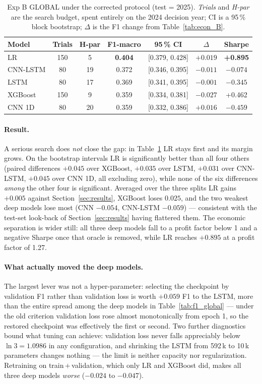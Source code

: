 \documentclass[runningheads]{llncs}
\begin{document}
\begin{table}[t]
\centering
\small
\caption{Exp B GLOBAL under the corrected protocol (test = 2025). \emph{Trials} and
\emph{H-par} are the search budget, spent entirely on the 2024 decision year; CI is
a 95\,\% block bootstrap; $\Delta$ is the F1 change from Table~\ref{tab:econ_B}.}
\label{tab:robust}
\begin{tabular}{lcccccc}
\toprule
Model & Trials & H-par & F1-macro & 95\,\% CI & $\Delta$ & Sharpe \\
\midrule
LR & 150 & 5 & \textbf{0.404} & [0.379, 0.428] & $+0.019$ & \textbf{+0.895} \\
CNN-LSTM & 80 & 19 & 0.372 & [0.346, 0.395] & $-0.011$ & $-0.074$ \\
LSTM & 80 & 17 & 0.369 & [0.341, 0.395] & $-0.001$ & $-0.345$ \\
XGBoost & 150 & 9 & 0.359 & [0.334, 0.381] & $-0.027$ & +0.462 \\
CNN 1D & 80 & 20 & 0.359 & [0.332, 0.386] & $+0.016$ & $-0.459$ \\
\bottomrule
\end{tabular}
\end{table}

\paragraph{Result.}
A serious search does \emph{not} close the gap: in Table~\ref{tab:robust} LR stays
first and its margin grows. On the bootstrap intervals LR is significantly better
than all four others (paired differences $+0.045$ over XGBoost, $+0.035$ over LSTM,
$+0.031$ over CNN-LSTM, $+0.045$ over CNN 1D, all excluding zero), while none of the
six differences \emph{among} the other four is significant. Averaged over the three
splits LR gains $+0.005$ against Section~\ref{sec:results}, XGBoost loses $0.025$,
and the two weakest deep models lose most (CNN $-0.054$, CNN-LSTM $-0.059$) ---
consistent with the test-set look-back of Section~\ref{sec:results} having
flattered them. The economic separation is wider still: all three deep models fall
to a profit factor below 1 and a negative Sharpe once that oracle is removed, while
LR reaches $+0.895$ at a profit factor of 1.27.

\paragraph{What actually moved the deep models.}
The largest lever was not a hyper-parameter: selecting the checkpoint by validation
F1 rather than validation loss is worth $+0.059$ F1 to the LSTM, more than the
entire spread among the deep models in Table~\ref{tab:f1_global} --- under the old
criterion validation loss rose almost monotonically from epoch 1, so the restored
checkpoint was effectively the first or second. Two further diagnostics bound what
tuning can achieve: validation loss never falls appreciably below $\ln 3 = 1.0986$
in any configuration, and shrinking the LSTM from 592\,k to 10\,k parameters
changes nothing --- the limit is neither capacity nor regularization. Retraining on
train\,$+$\,validation, which only LR and XGBoost did, makes all three deep models
\emph{worse} ($-0.024$ to $-0.047$).
\end{document}
